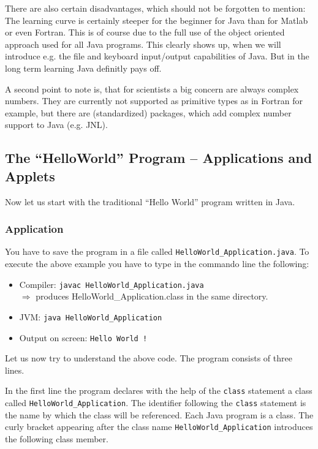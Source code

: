 There are also certain disadvantages, which should not be forgotten
to mention: The learning curve is certainly steeper for the beginner
for Java than for Matlab or even Fortran. This is of course due
to the full use of the object oriented approach used for all Java
programs. This clearly shows up, when we will introduce e.g. the
file and keyboard input/output capabilities of Java.
But in the long term learning Java definitly pays off. 

A second point to note is, that for scientists a big concern are always
complex numbers. They are currently not supported as primitive types as 
in Fortran for example, but there are (standardized) packages, which
add complex number support to Java (e.g. JNL). 


\subsection{The ``HelloWorld'' Program -- Applications and Applets}
\label{sec:HelloWorld}
Now let us start with the traditional ``Hello World'' program written
in Java.

\subsubsection{Application}

You have to save the program in a file called 
\verb|HelloWorld_Application.java|.
To execute the above example you have to type in the commando line the
following:
\begin{itemize}
\item Compiler: \verb/javac HelloWorld_Application.java/  \\
  $\Longrightarrow$ produces HelloWorld\_Application.class 
  in the same directory.
\item JVM:  \verb/java HelloWorld_Application/
\item Output on screen: \verb<Hello World !<
\end{itemize}
Let us now try to understand the above code. The program consists of
three lines. 

In the first line the program declares 
with the help of the \texttt{class} statement a class called 
\verb|HelloWorld_Application|. 
The identifier following the \texttt{class} statement is
the name by which the class will be referenced. Each Java program
is a class. The curly bracket appearing after the class name
\verb|HelloWorld_Application| introduces the following class member. 


